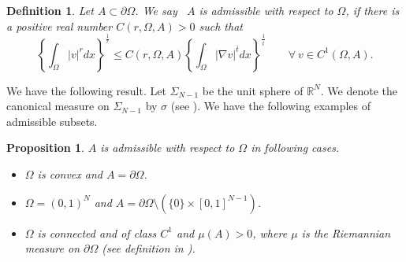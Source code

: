 \documentclass[11pt, a4paper]{article}
\newtheorem{proposition}[theorem]{Proposition}%
\newtheorem{definition}{Definition}%
\numberwithin{equation}{section}
\newcommand{\hk}{\hspace*{.12in}}
\newcommand{\RR}{{\mathbb R}}
\begin{document}
  \begin{definition} Let  $A\subset \partial\Omega$. We say ~$A$   is admissible with respect to $\Omega$, if there is a positive real number $C(r,\Omega,A)>0$ such that
  \begin{equation}\left\{\int_{\Omega} |v|^{r}dx\right\}^{\frac{1}{r}}\le C(r,\Omega,A)\left\{\int_{\Omega} |\nabla v|^{\overline{t}}dx\right\}^{\frac{1}{\overline{t}}} \qquad\forall ~v \in C^{1}(\Omega,A).
\label{ineq}
\end{equation}   
  \label{d41}
 \end{definition} \hk   
 We have the following result.
 Let $\Sigma_{N-1}$ be the unit sphere of $\RR^{N}$. We denote the canonical measure on $\Sigma_{N-1}$ by $\sigma$ (see  \cite[\S III.3]{chavelRiemannianGeometry2006}). We have the following examples of admissible subsets.
  \begin{proposition}  $A$ is admissible with respect to $\Omega$ in
    following cases. 
    \begin{itemize}[wide]
    \item[(i)] $\Omega$ is convex and $A=\partial\Omega$.
    \item[(ii)] $\Omega=(0,1)^{N}$ and $A =\partial\Omega \setminus
      (\{0\}\times[0,1]^{N-1})$.
    \item[(iii)] $\Omega$ is connected and of class $C^{1}$ and $\mu(A)>0$, where $\mu$ is the Riemannian measure on $\partial\Omega$ (see definition in \cite[pp.120-121]{chavelRiemannianGeometry2006}).
    \end{itemize}
 \label{admissible}
  \end{proposition}
\end{document}
